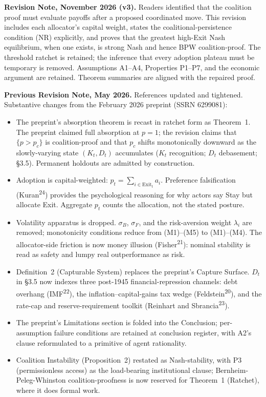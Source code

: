 \documentclass[12pt]{article}
\theoremstyle{definition}
\theoremstyle{remark}
\begin{document}
\newpage

\noindent\textbf{Revision Note, November 2026 (v3).}
Readers identified that the coalition proof must evaluate payoffs after a proposed coordinated move. This revision includes each allocator's capital weight, states the coalitional-persistence condition (NR) explicitly, and proves that the greatest high-Exit Nash equilibrium, when one exists, is strong Nash and hence BPW coalition-proof. The threshold ratchet is retained; the inference that every adoption plateau must be temporary is removed. Assumptions A1--A4, Properties P1--P7, and the economic argument are retained. Theorem summaries are aligned with the repaired proof.

\smallskip

\noindent\textbf{Previous Revision Note, May 2026.}
References updated and tightened. Substantive changes from the February 2026 preprint (SSRN 6299081):

\smallskip

\begin{itemize}
\item The preprint's absorption theorem is recast in ratchet form as Theorem~1. The preprint claimed full absorption at $p = 1$; the revision claims that $\{p > p_c\}$ is coalition-proof and that $p_c$ shifts monotonically downward as the slowly-varying state $(K_t, D_t)$ accumulates ($K_t$ recognition; $D_t$ debasement; \S3.5). Permanent holdouts are admitted by construction.
\item Adoption is capital-weighted: $p_t = \sum_{i \in \text{Exit}_t} a_i$. Preference falsification (Kuran\textsuperscript{24}) provides the psychological reasoning for why actors say Stay but allocate Exit. Aggregate $p_t$ counts the allocation, not the stated posture.
\item Volatility apparatus is dropped. $\sigma_B$, $\sigma_F$, and the risk-aversion weight $\lambda_i$ are removed; monotonicity conditions reduce from (M1)--(M5) to (M1)--(M4). The allocator-side friction is now money illusion (Fisher\textsuperscript{21}): nominal stability is read as safety and lumpy real outperformance as risk.
\item Definition~2 (Capturable System) replaces the preprint's Capture Surface. $D_t$ in \S3.5 now indexes three post-1945 financial-repression channels: debt overhang (IMF\textsuperscript{22}), the inflation--capital-gains tax wedge (Feldstein\textsuperscript{20}), and the rate-cap and reserve-requirement toolkit (Reinhart and Sbrancia\textsuperscript{23}).
\item The preprint's Limitations section is folded into the Conclusion; per-assumption failure conditions are retained at conclusion register, with A2's clause reformulated to a primitive of agent rationality.
\item Coalition Instability (Proposition~2) restated as Nash-stability, with P3 (permissionless access) as the load-bearing institutional clause; Bernheim-Peleg-Whinston coalition-proofness is now reserved for Theorem~1 (Ratchet), where it does formal work.
\end{itemize}
\end{document}
